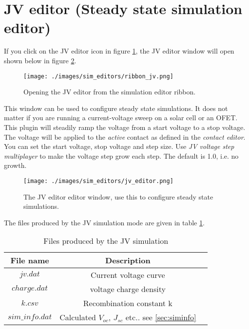 \newpage
\section{JV editor (Steady state simulation editor)}
If you click on the JV editor icon in figure \ref{fig:ribbon_jv}, the JV editor window will open shown below in figure \ref{fig:jvcurveeditor}.

\begin{figure}[H]
\centering
\texttt{[image: ./images/sim\_editors/ribbon\_jv.png]}
\caption{Opening the JV editor from the simulation editor ribbon.}
\label{fig:ribbon_jv}
\end{figure}

This window can be used to configure steady state simulations. It does not matter if you are running a current-voltage sweep on a solar cell or an OFET.  This plugin will steadily ramp the voltage from a start voltage to a stop voltage.  The voltage will be applied to the \emph{active} contact as defined in the \emph{contact editor}.  You can set the start voltage, stop voltage and step size.  Use \emph{JV voltage step multiplayer} to make the voltage step grow each step.  The default is 1.0, i.e. no growth.

\begin{figure}[H]
\centering
\texttt{[image: ./images/sim\_editors/jv\_editor.png]}
\caption{The JV editor editor window, use this to configure steady state simulations.}
\label{fig:jvcurveeditor}
\end{figure}

The files produced by the JV simulation mode are given in table \ref{tab:jv_output}.

\begin{table}[H]
\begin{center}
\begin{tabular}{ |c|c|c| } 
 \hline
	File name 			& 	Description  \\ 
 \hline
	$jv.dat$ 			&	Current voltage curve \\ 
	$charge.dat$ 		&	voltage charge density\\ 
	$k.csv$ 			&	Recombination constant k\\ 
	$sim\_info.dat$ 	&	Calculated $V_{oc}$, $J_{sc}$ etc.. see \ref{sec:siminfo}   \\

 \hline
\end{tabular}
\caption{Files produced by the JV simulation}
\label{tab:jv_output}
\end{center}
\end{table}


